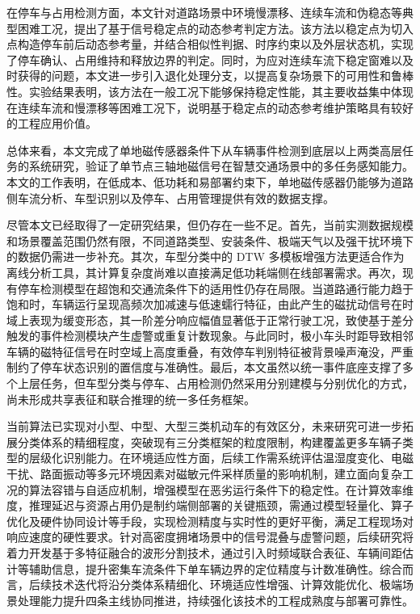 \documentclass{xdupgthesis}
\begin{document}
在停车与占用检测方面，本文针对道路场景中环境慢漂移、连续车流和伪稳态等典型困难工况，提出了基于信号稳定点的动态参考判定方法。该方法以稳定点为切入点构造停车前后动态参考量，并结合相似性判据、时序约束以及外层状态机，实现了停车确认、占用维持和释放边界的判定。同时，为应对连续车流下稳定窗难以及时获得的问题，本文进一步引入退化处理分支，以提高复杂场景下的可用性和鲁棒性。实验结果表明，该方法在一般工况下能够保持稳定性能，其主要收益集中体现在连续车流和慢漂移等困难工况下，说明基于稳定点的动态参考维护策略具有较好的工程应用价值。

总体来看，本文完成了单地磁传感器条件下从车辆事件检测到底层以上两类高层任务的系统研究，验证了单节点三轴地磁信号在智慧交通场景中的多任务感知能力。本文的工作表明，在低成本、低功耗和易部署约束下，单地磁传感器仍能够为道路侧车流分析、车型识别以及停车、占用管理提供有效的数据支撑。

尽管本文已经取得了一定研究结果，但仍存在一些不足。首先，当前实测数据规模和场景覆盖范围仍然有限，不同道路类型、安装条件、极端天气以及强干扰环境下的数据仍需进一步补充。其次，车型分类中的 DTW 多模板增强方法更适合作为离线分析工具，其计算复杂度尚难以直接满足低功耗端侧在线部署需求。再次，现有停车检测模型在超饱和交通流条件下的适用性仍存在局限。当道路通行能力趋于饱和时，车辆运行呈现高频次加减速与低速蠕行特征，由此产生的磁扰动信号在时域上表现为缓变形态，其一阶差分响应幅值显著低于正常行驶工况，致使基于差分触发的事件检测模块产生虚警或重复计数现象。与此同时，极小车头时距导致相邻车辆的磁特征信号在时空域上高度重叠，有效停车判别特征被背景噪声淹没，严重制约了停车状态识别的置信度与准确性。最后，本文虽然以统一事件底座支撑了多个上层任务，但车型分类与停车、占用检测仍然采用分别建模与分别优化的方式，尚未形成共享表征和联合推理的统一多任务框架。

当前算法已实现对小型、中型、大型三类机动车的有效区分，未来研究可进一步拓展分类体系的精细程度，突破现有三分类框架的粒度限制，构建覆盖更多车辆子类型的层级化识别能力。在环境适应性方面，后续工作需系统评估温湿度变化、电磁干扰、路面振动等多元环境因素对磁敏元件采样质量的影响机制，建立面向复杂工况的算法容错与自适应机制，增强模型在恶劣运行条件下的稳定性。在计算效率维度，推理延迟与资源占用仍是制约端侧部署的关键瓶颈，需通过模型轻量化、算子优化及硬件协同设计等手段，实现检测精度与实时性的更好平衡，满足工程现场对响应速度的硬性要求。针对高密度拥堵场景中的信号混叠与虚警问题，后续研究将着力开发基于多特征融合的波形分割技术，通过引入时频域联合表征、车辆间距估计等辅助信息，提升密集车流条件下单车辆边界的定位精度与计数准确性。综合而言，后续技术迭代将沿分类体系精细化、环境适应性增强、计算效能优化、极端场景处理能力提升四条主线协同推进，持续强化该技术的工程成熟度与部署可靠性。
\end{document}
